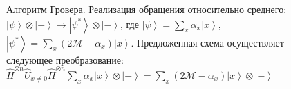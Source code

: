 \begin{figure}
\centering



\caption{Алгоритм Гровера. Реализация обращения относительно
  среднего: $\left|\psi\right>\otimes\left|-\right> \rightarrow
  \left|\psi^{\ast}\right>\otimes\left|-\right>$, где
$\left|\psi\right> = \sum_x \alpha_x \left| x \right>$, 
$\left|\psi^{\ast}\right> = \sum_x \left( 2 \mathcal{M} -  \alpha_x \right)
  \left| x \right>$. 
Предложенная схема осуществляет следующее преобразование: 
$\hat{H}^{\otimes n}\hat{U}_{x \ne 0}\hat{H}^{\otimes n} \sum_x
  \alpha_x \left| x \right> \otimes \left| - \right > = 
\sum_x \left( 2 \mathcal{M} -  \alpha_x \right) \left| x \right>
\otimes \left| - \right >
$
} 
\label{figQuantCompGroverMeanInvImpl}
\end{figure}
